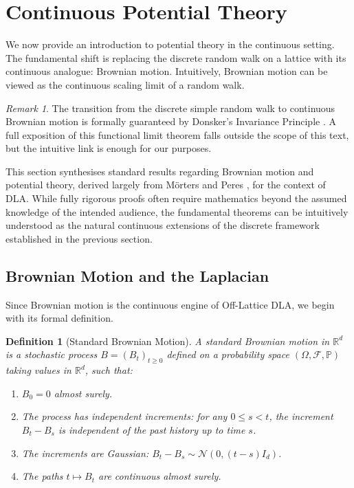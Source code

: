 \documentclass[12pt, a4paper, oneside]{report}
\newtheorem{definition}[theorem]{Definition}
\theoremstyle{remark}
\newtheorem{remark}[theorem]{Remark}
\begin{document}
\section[Continuous Potential Theory]{Continuous Potential Theory}
\label{sec:continuous_theory}
We now provide an introduction to potential theory in the continuous setting. The fundamental shift is replacing the discrete random walk on a lattice with its continuous analogue: Brownian motion. Intuitively, Brownian motion can be viewed as the continuous scaling limit of a random walk. 

\begin{remark}
    The transition from the discrete simple random walk to continuous Brownian motion is formally guaranteed by Donsker's Invariance Principle \cite[Theorem 5.22]{Morters2010}. A full exposition of this functional limit theorem falls outside the scope of this text, but the intuitive link is enough for our purposes.
\end{remark}

This section synthesises standard results regarding Brownian motion and potential theory, derived largely from M{\"o}rters and Peres \cite{Morters2010}, for the context of DLA. While fully rigorous proofs often require mathematics beyond the assumed knowledge of the intended audience, the fundamental theorems can be intuitively understood as the natural continuous extensions of the discrete framework established in the previous section.


\subsection{Brownian Motion and the Laplacian}

Since Brownian motion is the continuous engine of Off-Lattice DLA, we begin with its formal definition.

\begin{definition}[Standard Brownian Motion]
A standard Brownian motion in $\mathbb{R}^d$ is a stochastic process $B = (B_t)_{t \ge 0}$ defined on a probability space $(\Omega, \mathcal{F}, \mathbb{P})$ taking values in $\mathbb{R}^d$, such that:
\begin{enumerate}
    \item $B_0 = 0$ almost surely.
    \item The process has independent increments: for any $0 \le s < t$, the increment $B_t - B_s$ is independent of the past history up to time $s$.
    \item The increments are Gaussian: $B_t - B_s \sim \mathcal{N}(0, (t-s)I_d)$.
    \item The paths $t \mapsto B_t$ are continuous almost surely.
\end{enumerate}
\end{definition}
\end{document}
